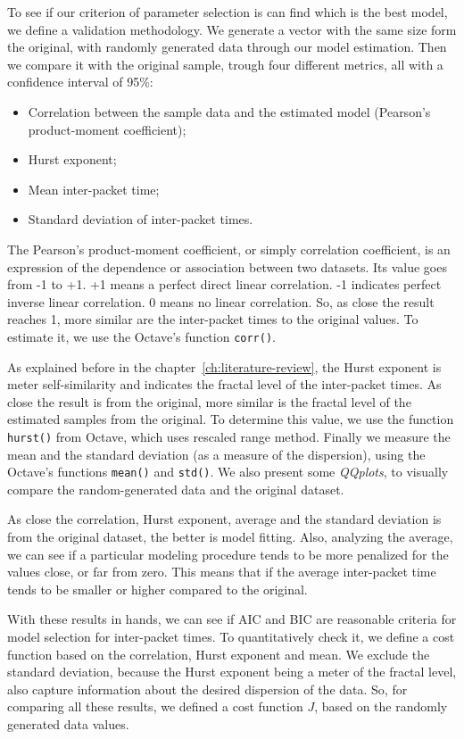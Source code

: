 To see if our criterion of parameter selection is can find which is the best model, we define a validation methodology. 
We generate a vector with the same size form the original, with randomly generated data through our model estimation. Then we compare it with the original sample, trough four different metrics, all with a confidence interval of 95\%:

\begin{itemize}
\item Correlation between the sample data and the estimated model (Pearson's product-moment coefficient);
\item Hurst exponent;
\item Mean inter-packet time;
\item Standard deviation of inter-packet times.
\end{itemize}

The Pearson's product-moment coefficient, or simply correlation coefficient,  is an expression of the dependence or association between two datasets. Its value goes from -1 to +1. +1 means a perfect direct linear correlation. -1 indicates perfect inverse linear correlation. 0 means no linear correlation. So, as close the result reaches 1, more similar are the inter-packet times to the original values. To estimate it, we use the Octave's function \texttt{corr()}.

As explained before in the chapter~\ref{ch:literature-review}, the Hurst exponent is meter self-similarity and indicates the fractal level of the inter-packet times. As close the result is from the original, more similar is the fractal level of the estimated samples from the original. To determine this value, we use the function \texttt{hurst()} from Octave, which uses rescaled range method.
Finally we measure the mean and the standard deviation (as a measure of the dispersion), using the Octave's functions \texttt{mean()} and \texttt{std()}. We also present some \textit{QQplots}, to visually compare the random-generated data and the original dataset. 

As close the correlation, Hurst exponent, average and the standard deviation is from the original dataset, the better is model fitting. Also, analyzing the average, we can see if a particular modeling procedure tends to be more penalized for the values close, or far from zero. This means that if the average inter-packet time tends to be smaller or higher compared to the original. 

With these results in hands, we can see if AIC and BIC are reasonable criteria for model selection for inter-packet times. To quantitatively check it, we define a cost function based on the correlation, Hurst exponent and mean. We exclude the standard deviation, because the Hurst exponent being a meter of the fractal level, also capture information about the desired dispersion of the data. So, for comparing all these results, we defined a cost function $J$, based on the randomly generated data values.


